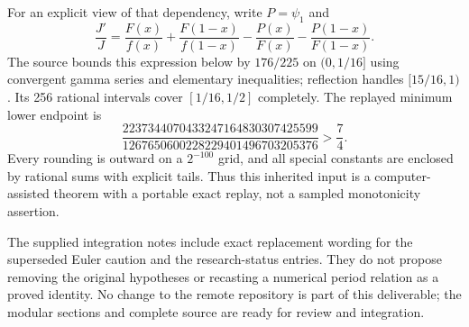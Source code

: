 For an explicit view of that dependency, write $P=\psi_1$ and
\[
 \frac{J'}J=
 \frac{F(x)}{f(x)}+\frac{F(1-x)}{f(1-x)}
 -\frac{P(x)}{F(x)}-\frac{P(1-x)}{F(1-x)}.
\]
The source bounds this expression below by $176/225$ on
$(0,1/16]$ using convergent gamma series and elementary inequalities;
reflection handles $[15/16,1)$. Its 256 rational intervals cover
$[1/16,1/2]$ completely. The replayed minimum lower endpoint is
\[
 \frac{2237344070433247164830307425599}
      {1267650600228229401496703205376}>\frac74.
\]
Every rounding is outward on a $2^{-100}$ grid, and all special constants
are enclosed by rational sums with explicit tails. Thus this inherited
input is a computer-assisted theorem with a portable exact replay,
not a sampled monotonicity assertion.

The supplied integration notes include exact replacement wording for
the superseded Euler caution and the research-status entries. They do
not propose removing the original hypotheses or recasting a numerical
period relation as a proved identity. No change to the remote repository
is part of this deliverable; the modular sections and complete source
are ready for review and integration.
